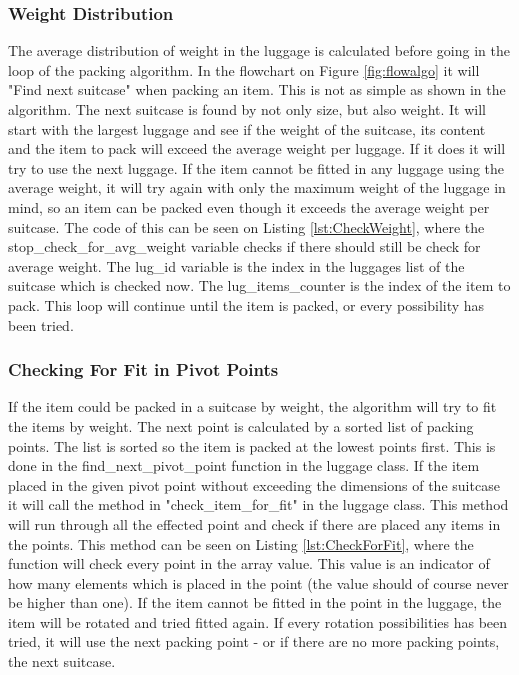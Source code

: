\subsubsection{Weight Distribution}
The average distribution of weight in the luggage is calculated before going in the loop of the packing algorithm. In the flowchart on Figure \ref{fig:flowalgo} it will "Find next suitcase" when packing an item. This is not as simple as shown in the algorithm. The next suitcase is found by not only size, but also weight. It will start with the largest luggage and see if the weight of the suitcase, its content and the item to pack will exceed the average weight per luggage. If it does it will try to use the next luggage. If the item cannot be fitted in any luggage using the average weight, it will try again with only the maximum weight of the luggage in mind, so an item can be packed even though it exceeds the average weight per suitcase. The code of this can be seen on Listing \ref{lst:CheckWeight}, where the stop\_check\_for\_avg\_weight variable checks if there should still be check for average weight. The lug\_id variable is the index in the luggages list of the suitcase which is checked now. The lug\_items\_counter is the index of the item to pack. This loop will continue until the item is packed, or every possibility has been tried.
\subsubsection{Checking For Fit in Pivot Points}
If the item could be packed in a suitcase by weight, the algorithm will try to fit the items by weight. The next point is calculated by a sorted list of packing points. The list is sorted so the item is packed at the lowest points first. This is done in the find\_next\_pivot\_point function in the luggage class. If the item placed in the given pivot point without exceeding the dimensions of the suitcase it will call the method in "check\_item\_for\_fit" in the luggage class. This method will run through all the effected point and check if there are placed any items in the points. This method can be seen on Listing \ref{lst:CheckForFit}, where the function will check every point in the array value. This value is an indicator of how many elements which is placed in the point (the value should of course never be higher than one).
If the item cannot be fitted in the point in the luggage, the item will be rotated and tried fitted again. If every rotation possibilities has been tried, it will use the next packing point - or if there are no more packing points, the next suitcase.
